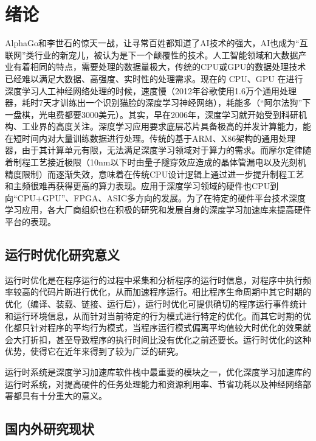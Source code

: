 
\chapter{绪论}

AlphaGo和李世石的惊天一战，让寻常百姓都知道了AI技术的强大，AI也成为“互联网”类行业的新宠儿，被认为是下一个颠覆性的技术。人工智能领域和大数据产业有着相同的特点，需要处理的数据量极大，传统的CPU或GPU的数据处理技术已经难以满足大数据、高强度、实时性的处理需求\cite{cyj}。现在的 CPU、GPU 在进行深度学习人工神经网络处理的时候，速度慢（2012年谷歌使用1.6万个通用处理器，耗时7天才训练出一个识别猫脸的深度学习神经网络），耗能多（“阿尔法狗”下一盘棋，光电费都要3000美元）。其实，早在2006年，深度学习就开始受到科研机构、工业界的高度关注。深度学习应用要求底层芯片具备极高的并发计算能力，能在短时间内对大量训练数据进行处理\cite{szjxl}。传统的基于ARM、X86架构的通用处理器，由于其计算单元有限，无法满足深度学习领域对于算力的需求。而摩尔定律随着制程工艺接近极限（10nm以下时由量子隧穿效应造成的晶体管漏电以及光刻机精度限制）而逐渐失效，意味着在传统CPU设计逻辑上通过进一步提升制程工艺和主频很难再获得更高的算力表现\cite{ljwly}。应用于深度学习领域的硬件也CPU到向“CPU+GPU”、FPGA、ASIC多方向的发展\cite{jdk}。为了在特定的硬件平台技术深度学习应用，各大厂商组织也在积极的研究和发展自身的深度学习加速库来提高硬件平台的表现。

\section{运行时优化研究意义}

运行时优化是在程序运行的过程中采集和分析程序的运行时信息，对程序中执行频率较高的代码片断进行优化，从而加速程序运行\cite{wangjin}。相比程序生命周期中其它时期的优化（编译、装载、链接、运行后），运行时优化可提供确切的程序运行事件统计和运行环境信息，从而针对当前特定的行为模式进行特定的优化\cite{frosenb}。而其它时期的优化都只针对程序的平均行为模式，当程序运行模式偏离平均值较大时优化的效果就会大打折扣，甚至导致程序的执行时间比没有优化之前还要长\cite{gzyll}。运行时优化的这种优势，使得它在近年来得到了较为广泛的研究。

运行时系统是深度学习加速库软件栈中最重要的模块之一，优化深度学习加速库的运行时系统，对提高硬件的任务处理能力和资源利用率、节省功耗以及神经网络部署都具有十分重大的意义。

\section{国内外研究现状}

